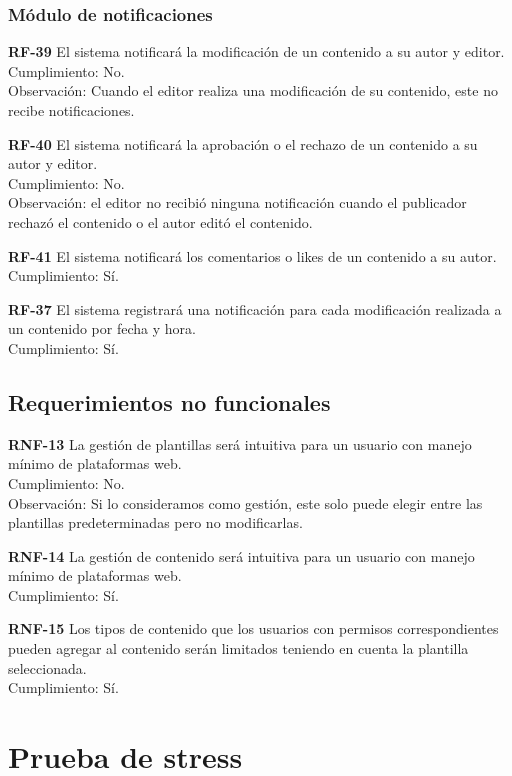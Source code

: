 \documentclass[10pt,times,twocolumn]{article}
\begin{document}
\subsubsection{Módulo de notificaciones}

\noindent \textbf{RF-39} El sistema notificará la modificación de un contenido a su autor y editor.\\
Cumplimiento: No.\\
Observación: Cuando el editor realiza una modificación de su contenido, este no recibe notificaciones.

\noindent \textbf{RF-40} El sistema notificará la aprobación o el rechazo de un contenido a su autor y editor.\\ 
Cumplimiento: No.\\
Observación: el editor no recibió ninguna notificación cuando el publicador rechazó el contenido o el autor editó el contenido.

\noindent \textbf{RF-41} El sistema notificará los comentarios o likes de un contenido a su autor.\\
Cumplimiento: Sí.

\noindent \textbf{RF-37} El sistema registrará una notificación para cada modificación realizada a un contenido por fecha y hora.\\
Cumplimiento: Sí.

\subsection{Requerimientos no funcionales}

\noindent \textbf{RNF-13} La gestión de plantillas será intuitiva para un usuario con manejo mínimo  de plataformas web.\\
Cumplimiento: No.\\
Observación: Si lo consideramos como gestión, este solo puede elegir entre las plantillas predeterminadas pero no modificarlas.

\noindent \textbf{RNF-14} La gestión de contenido será intuitiva para un usuario con manejo mínimo  de plataformas web.\\
Cumplimiento: Sí.

\noindent \textbf{RNF-15} Los tipos de contenido que los usuarios con permisos correspondientes  pueden agregar al contenido serán limitados teniendo en cuenta la plantilla seleccionada.\\
Cumplimiento: Sí.

\section{Prueba de stress}
\end{document}
